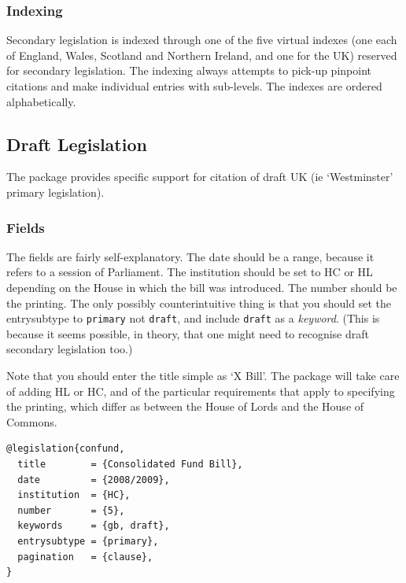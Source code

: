 \documentclass[a4paper,
               11pt,
	       DIV=1,			   
	       footinclude=false]
	      {scrartcl}
\newcounter{egcounter}\setcounter{egcounter}{0}
\newlength{\boxwidth}
\newenvironment{bibexample}[1][]
{%
  \medskip\par\noindent\ignorespaces
  \marginpar{[\refstepcounter{egcounter}\arabic{egcounter}]\label{#1}}%
  \setlength{\boxwidth}{0.95\linewidth}%
  \addtolength{\boxwidth}{-2\fboxsep}
  \addtolength{\boxwidth}{-2\fboxrule}
  \begin{lrbox}{\boxcontainer}
  \begin{minipage}[t]{\boxwidth}%
}
{%
  \end{minipage}\end{lrbox}%
  \colorbox{gray!30}{\usebox{\boxcontainer}}
  \par\medskip}
\begin{document}
\subsubsection{Indexing}
Secondary legislation is indexed through one of the five virtual indexes
(one each of England, Wales, Scotland and Northern Ireland, and one
for the UK) reserved for secondary legislation. The indexing always
attempts to pick-up pinpoint citations and make individual entries
with sub-levels. The indexes are ordered alphabetically.


\subsection{Draft Legislation}
The package provides specific support for citation of draft UK (ie
`Westminster' primary legislation).

\subsubsection{Fields}

The fields are fairly self-explanatory. The date should be a range,
because it refers to a session of Parliament. The institution should
be set to HC or HL depending on the House in which the bill was
introduced. The number should be the printing. The only possibly
counterintuitive thing is that you should set the entrysubtype to
\verb|primary| not \verb|draft|, and include \verb|draft| as a
\emph{keyword}. (This is because it seems possible, in theory, that
one might need to recognise draft secondary legislation too.)

Note that you should enter the title simple as `X Bill'. The package
will take care of adding HL or HC, and of the particular requirements
that apply to specifying the printing, which differ as between the
House of Lords and the House of Commons.

\begin{bibexample}[confund]
\begin{verbatim}
@legislation{confund,
  title        = {Consolidated Fund Bill},
  date         = {2008/2009},
  institution  = {HC},
  number       = {5},
  keywords     = {gb, draft},
  entrysubtype = {primary},
  pagination   = {clause},
}
\end{verbatim}
\end{bibexample}
\end{document}
